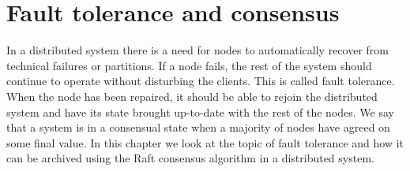 \chapter{Fault tolerance and consensus} \label{ch:faultToleranceandconsensus}

In a distributed system there is a need for nodes to automatically recover from technical failures or partitions. If a node fails, the rest of the system should continue to operate without disturbing the clients. This is called fault tolerance. When the node has been repaired, it should be able to rejoin the distributed system and have its state brought up-to-date with the rest of the nodes. We say that a system is in a consensual state when a majority of nodes have agreed on some final value. In this chapter we look at the topic of fault tolerance and how it can be archived using the Raft consensus algorithm in a distributed system.





